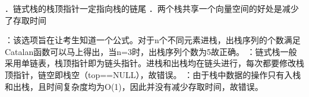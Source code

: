 ．链式栈的栈顶指针一定指向栈的链尾
．两个栈共享一个向量空间的好处是减少了存取时间
\par{}
\begin{solution}：该选项旨在让考生知道一个公式。对于n个不同元素进栈，出栈序列的个数满足Catalan函数可以马上得出，当n=3时，出栈序列个数为5故正确。
：链式栈一般采用单链表，栈顶指针即为链头指针。进栈和出栈均在链头进行，每次都要修改栈顶指针，链空即栈空（top==NULL），故错误。
：由于栈中数据的操作只有入栈和出栈，且时间复杂度均为O(1)，因此并没有减少存取时间，故错误。
\end{solution}
